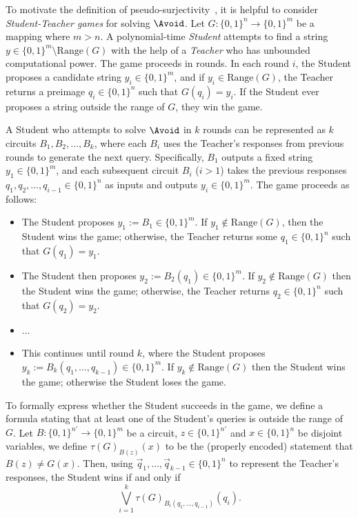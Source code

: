 \documentclass[10pt,a4paper]{article}
\theoremstyle{definition}
\theoremstyle{remark}
\newcommand{\Range}{\mathrm{Range}}
\begin{document}
To motivate the definition of pseudo-surjectivity~\cite[Definition 3.1]{Krajicek04}, it is helpful to consider \emph{Student-Teacher games} for solving $\Avoid$. Let $G: \{0, 1\}^n \to \{0, 1\}^m$ be a mapping where $m > n$. A polynomial-time \emph{Student} attempts to find a string $y \in \{0, 1\}^m \setminus \Range(G)$ with the help of a \emph{Teacher} who has unbounded computational power. The game proceeds in rounds. In each round $i$, the Student proposes a candidate string $y_i \in \{0, 1\}^m$, and if $y_i \in \Range(G)$, the Teacher returns a preimage $q_i \in \{0, 1\}^n$ such that $G(q_i) = y_i$. If the Student ever proposes a string outside the range of $G$, they win the game.

A Student who attempts to solve $\Avoid$ in $k$ rounds can be represented as $k$ circuits $B_1, B_2, \dots, B_k$, where each $B_i$ uses the Teacher's responses from previous rounds to generate the next query. Specifically, $B_1$ outputs a fixed string $y_1 \in \{0, 1\}^m$, and each subsequent circuit $B_i$ ($i > 1$) takes the previous responses $q_1, q_2, \dots, q_{i-1} \in \{0, 1\}^n$ as inputs and outputs $y_i \in \{0, 1\}^m$. The game proceeds as follows:

\begin{itemize}
    \item The Student proposes $y_1 := B_1\in \{0, 1\}^m$. If $y_1 \not\in\Range(G)$, then the Student wins the game; otherwise, the Teacher returns some $q_1 \in \{0, 1\}^n$ such that $G(q_1) = y_1$.
    \item The Student then proposes $y_2 := B_2(q_1) \in \{0, 1\}^m$. If $y_2 \not \in \Range(G)$ then the Student wins the game; otherwise, the Teacher returns $q_2 \in \{0, 1\}^n$ such that $G(q_2) = y_2$.
    \item $\dots$
    \item This continues until round $k$, where the Student proposes $y_k := B_k(q_1, \dots, q_{k-1}) \in \{0, 1\}^m$. If $y_k \not\in \Range(G)$ then the Student wins the game; otherwise the Student loses the game.
\end{itemize}

To formally express whether the Student succeeds in the game, we define a formula stating that at least one of the Student's queries is outside the range of $G$. Let $B: \{0, 1\}^{n'} \to \{0, 1\}^m$ be a circuit, $z \in \{0, 1\}^{n'}$ and $x \in \{0, 1\}^n$ be disjoint variables, we define $\tau(G)_{B(z)}(x)$ to be the (properly encoded) statement that $B(z) \ne G(x)$. Then, using $\vec{q}_1, \dots, \vec{q}_{k-1} \in \{0, 1\}^n$ to represent the Teacher's responses, the Student wins if and only if
\begin{equation}
   \label{eq: the student wins the game} \bigvee_{i=1}^k\tau(G)_{B_i(q_1, \dots, q_{i-1})}(q_i).
\end{equation}
\end{document}
